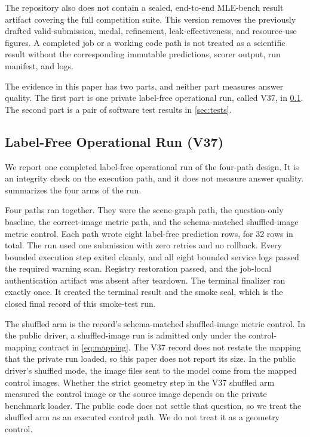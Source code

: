\documentclass{article}
\begin{document}
The repository also does not contain a sealed, end-to-end MLE-bench result artifact covering the full competition suite. This version removes the previously drafted valid-submission, medal, refinement, leak-effectiveness, and resource-use figures. A completed job or a working code path is not treated as a scientific result without the corresponding immutable predictions, scorer output, run manifest, and logs.

The evidence in this paper has two parts, and neither part measures answer quality. The first part is one private label-free operational run, called V37, in \cref{sec:v37}. The second part is a pair of software test results in \cref{sec:tests}.

\subsection{Label-Free Operational Run (V37)}
\label{sec:v37}

We report one completed label-free operational run of the four-path design. It is an integrity check on the execution path, and it does not measure answer quality.  summarizes the four arms of the run.



Four paths ran together. They were the scene-graph path, the question-only baseline, the correct-image metric path, and the schema-matched shuffled-image metric control. Each path wrote eight label-free prediction rows, for 32 rows in total. The run used one submission with zero retries and no rollback. Every bounded execution step exited cleanly, and all eight bounded service logs passed the required warning scan. Registry restoration passed, and the job-local authentication artifact was absent after teardown. The terminal finalizer ran exactly once. It created the terminal result and the smoke seal, which is the closed final record of this smoke-test run.

The shuffled arm is the record's schema-matched shuffled-image metric control. In the public driver, a shuffled-image run is admitted only under the control-mapping contract in \cref{eq:mapping}. The V37 record does not restate the mapping that the private run loaded, so this paper does not report its size. In the public driver's shuffled mode, the image files sent to the model come from the mapped control images. Whether the strict geometry step in the V37 shuffled arm measured the control image or the source image depends on the private benchmark loader. The public code does not settle that question, so we treat the shuffled arm as an executed control path. We do not treat it as a geometry control.
\end{document}
